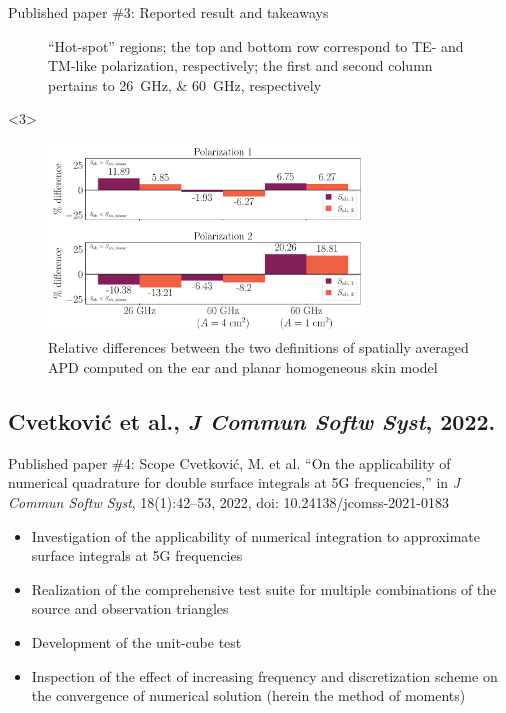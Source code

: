 \documentclass[xcolor=dvipsnames,10pt]{beamer}
\begin{document}
\begin{frame}{Published paper \#3: Reported result and takeaways}
\begin{onlyenv}
\begin{figure}
            \caption{``Hot-spot'' regions; the top and bottom row correspond to TE- and TM-like polarization, respectively; the first and second column pertains to \SIlist{26;60}{\GHz}, respectively}
        \end{figure}
    \end{onlyenv}
    \begin{onlyenv}<3>
        \begin{figure}
            \centering
            \includegraphics[width=0.75\textwidth]{artwork/IEEE-JERM-rpd.pdf}
            \caption{Relative differences between the two definitions of spatially averaged APD computed on the ear and planar homogeneous skin model}
        \end{figure}
    \end{onlyenv}
\end{frame}

\subsection{Cvetković et al., \textit{J Commun Softw Syst}, 2022.}
\begin{frame}{Published paper \#4: Scope}
    Cvetković, M. et al. ``On the applicability of numerical quadrature for double surface integrals at {5G} frequencies,'' in \textit{J Commun Softw Syst}, 18(1):42--53, 2022, doi: 10.24138/jcomss-2021-0183
    \begin{itemize}
        \item Investigation of the applicability of numerical integration to approximate surface integrals at 5G frequencies
        \item Realization of the comprehensive test suite for multiple combinations of the source and observation triangles
        \item Development of the unit-cube test
        \item Inspection of the effect of increasing frequency and discretization scheme on the convergence of numerical solution (herein the method of moments)
    \end{itemize}
\end{frame}
\end{document}
